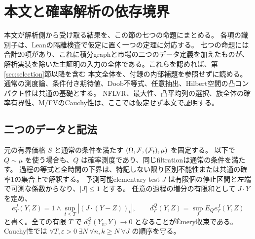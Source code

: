 \section{本文と確率解析の依存境界}
\label{sec:graph}
本文が解析側から受け取る結果を、この節の七つの命題にまとめる。
各項の識別子は、Leanの隔離検査で仮定に置く一つの定理に対応する。
七つの命題には合計20項があり、これに積分graphと市場の二つのデータ定義を加えたものが、
解析実装を除いた主証明の入力の全体である。これらを認めれば、第\ref{sec:selection}節以降を含む
本文全体を、付録の内部補題を参照せずに読める。
通常の測度論、条件付き期待値、Doob不等式、任意抽出、Hilbert空間の凸コンパクト性は共通の基礎とする。
NFLVR、最大性、凸平均列の選択、族全体の確率有界性、M/FVのCauchy性は、ここでは仮定せず本文で証明する。

\subsection{二つのデータと記法}
元の有界価格 $S$ と通常の条件を満たす $(\Omega,\mathcal F,(\mathcal F_t),\mu)$ を固定する。
以下で $Q\sim\mu$ を使う場合も、$Q$ は確率測度であり、同じfiltrationは通常の条件を満たす。
過程の等式と全時間の下界は、特記しない限り区別不能性または共通の確率1の集合上で解釈する。
予測可能elementary test $J$ は有限個の停止区間と左端で可測な係数からなり、$|J|\leq1$ とする。
任意の過程の増分の有限和として $J\cdot Y$ を定め、
\[
 e_T^J(Y,Z)=1\wedge\sup_{t\leq T}|(J\cdot(Y-Z))_t|,
 \qquad d_T^Q(Y,Z)=\sup_J E_Q e_T^J(Y,Z)
\]
と書く。全ての有限 $T$ で $d_T^Q(Y_n,Y)\to0$ となることがÉmery収束である。
Cauchy性では $\forall T,\varepsilon>0\ \exists N\ \forall n,k\geq N\ \forall J$ の順序を守る。

